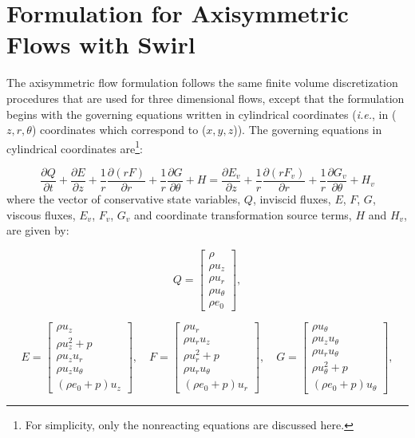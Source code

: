 \section{Formulation for Axisymmetric Flows with Swirl}
The axisymmetric flow formulation follows the same finite volume discretization procedures that are used for three dimensional flows, except that the formulation begins with the governing equations written in cylindrical coordinates ({\it{i.e.}}, in ($z, r, \theta$) coordinates which correspond to ($x, y, z$)).  The governing equations in cylindrical coordinates are\footnote{For simplicity, only the nonreacting equations are discussed here.}:

\begin{equation}
\frac{\partial Q}{\partial t} + \frac{\partial E}{\partial z} + \frac{1}{r} \frac{\partial (r F)}{\partial r} + \frac{1}{r} \frac{\partial G}{\partial \theta} + H =
\frac{\partial E_v}{\partial z} + \frac{1}{r} \frac{\partial (r F_v)}{\partial r} + \frac{1}{r} \frac{\partial G_v}{\partial \theta} + H_v
\end{equation}
where the vector of conservative state variables, $Q$, inviscid fluxes, $E$, $F$, $G$,
viscous fluxes, $E_v$, $F_v$, $G_v$ and coordinate transformation source terms, $H$ and $H_v$, are given by:

\begin{equation}
Q =
\begin{bmatrix}
\rho \\
\rho u_z \\
\rho u_r \\
\rho u_\theta \\
\rho e_0
\end{bmatrix}
,
\end{equation}

\begin{equation}
E =
\begin{bmatrix}
\rho u_z \\
\rho u_z^2 + p \\
\rho u_z u_r \\
\rho u_z u_\theta \\
\left(\rho e_0 + p\right) u_z
\end{bmatrix}, \quad
F =
\begin{bmatrix}
\rho u_r \\
\rho u_r u_z \\
\rho u_r^2 + p \\
\rho u_r u_\theta \\
\left(\rho e_0 + p\right) u_r
\end{bmatrix}, \quad
G =
\begin{bmatrix}
\rho u_\theta \\
\rho u_z u_\theta \\
\rho u_r u_\theta \\
\rho u_\theta ^2 + p \\
\left(\rho e_0 + p\right) u_\theta
\end{bmatrix}
, 
\end{equation}

